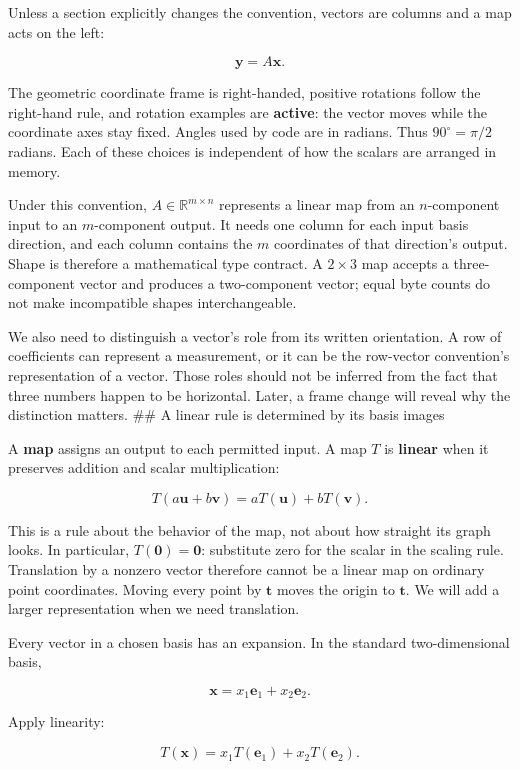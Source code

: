 Unless a section explicitly changes the convention, vectors are columns and a map acts on the left:

\[
\mathbf y=A\mathbf x.
\]

The geometric coordinate frame is right-handed, positive rotations follow the right-hand rule, and rotation examples are \textbf{active}: the vector moves while the coordinate axes stay fixed. Angles used by code are in radians. Thus \(90^\circ=\pi/2\) radians. Each of these choices is independent of how the scalars are arranged in memory.

Under this convention, \(A\in\mathbb R^{m\times n}\) represents a linear map from an \(n\)-component input to an \(m\)-component output. It needs one column for each input basis direction, and each column contains the \(m\) coordinates of that direction's output. Shape is therefore a mathematical type contract. A \(2\times3\) map accepts a three-component vector and produces a two-component vector; equal byte counts do not make incompatible shapes interchangeable.

We also need to distinguish a vector's role from its written orientation. A row of coefficients can represent a measurement, or it can be the row-vector convention's representation of a vector. Those roles should not be inferred from the fact that three numbers happen to be horizontal. Later, a frame change will reveal why the distinction matters. \#\# A linear rule is determined by its basis images

A \textbf{map} assigns an output to each permitted input. A map \(T\) is \textbf{linear} when it preserves addition and scalar multiplication:

\[
T(a\mathbf u+b\mathbf v)=aT(\mathbf u)+bT(\mathbf v).
\]

This is a rule about the behavior of the map, not about how straight its graph looks. In particular, \(T(\mathbf0)=\mathbf0\): substitute zero for the scalar in the scaling rule. Translation by a nonzero vector therefore cannot be a linear map on ordinary point coordinates. Moving every point by \(\mathbf t\) moves the origin to \(\mathbf t\). We will add a larger representation when we need translation.

Every vector in a chosen basis has an expansion. In the standard two-dimensional basis,

\[
\mathbf x=x_1\mathbf e_1+x_2\mathbf e_2.
\]

Apply linearity:

\[
T(\mathbf x)=x_1T(\mathbf e_1)+x_2T(\mathbf e_2).
\]

